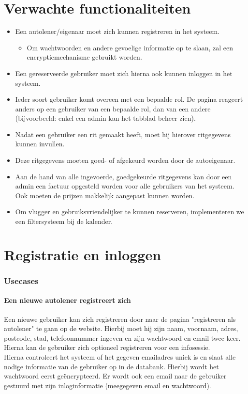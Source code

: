 \documentclass[11pt,a4paper,oneside]{article}
\begin{document}
\part{Verwachte functionaliteiten}
\begin{itemize}
	\item	Een autolener/eigenaar moet zich kunnen registreren in het systeem.
		\begin{itemize}
			\item	Om wachtwoorden en andere gevoelige informatie op te slaan, zal een encryptiemechanisme gebruikt worden.
		\end{itemize}
	\item	Een gereserveerde gebruiker moet zich hierna ook kunnen inloggen in het systeem.
	\item	Ieder soort gebruiker komt overeen met een bepaalde rol. De pagina reageert anders op een gebruiker van een bepaalde rol, dan van een andere (bijvoorbeeld: enkel een admin kan het tabblad beheer zien).
	\item	Nadat een gebruiker een rit gemaakt heeft, moet hij hierover ritgegevens kunnen invullen.
	\item	Deze ritgegevens moeten goed- of afgekeurd worden door de autoeigenaar.
	\item	Aan de hand van alle ingevoerde, goedgekeurde ritgegevens kan door een admin een factuur opgesteld worden voor alle gebruikers van het systeem. Ook moeten de prijzen makkelijk aangepast kunnen worden.
	\item	Om vlugger en gebruiksvriendelijker te kunnen reserveren, implementeren we een filtersysteem bij de kalender.
\end{itemize}

\setcounter{section}{0}
\setcounter{subsection}{0}
\part{Registratie en inloggen}
\section{Usecases}
\subsection{Een nieuwe autolener registreert zich}
Een nieuwe gebruiker kan zich registreren door naar de pagina "registreren als autolener" te gaan op de website. Hierbij moet hij zijn naam, voornaam, adres, postcode, stad, telefoonnummer ingeven en zijn wachtwoord en email twee keer. Hierna kan de gebruiker zich optioneel registreren voor een infosessie. \\
Hierna controleert het systeem of het gegeven emailadres uniek is en slaat alle nodige informatie van de gebruiker op in de databank. Hierbij wordt het wachtwoord eerst ge\"{e}ncrypteerd. Er wordt ook een email naar de gebruiker gestuurd met zijn inloginformatie (meegegeven email en wachtwoord).
\end{document}
